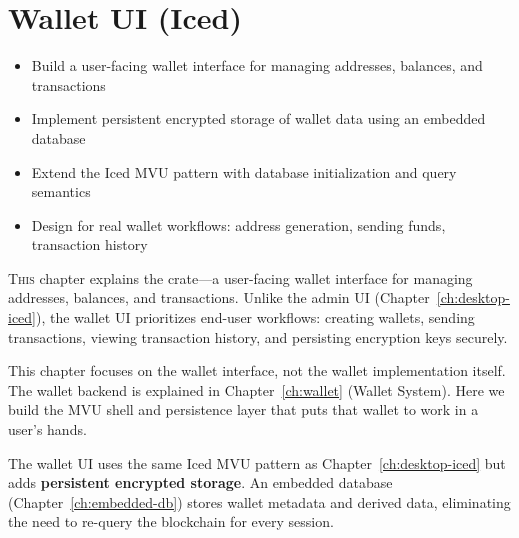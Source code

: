 \chapter{Wallet UI (Iced)}
\label{ch:wallet-iced}

\begin{learnbox}
\begin{itemize}
  \item Build a user-facing wallet interface for managing addresses, balances, and transactions
  \item Implement persistent encrypted storage of wallet data using an embedded database
  \item Extend the Iced MVU pattern with database initialization and query semantics
  \item Design for real wallet workflows: address generation, sending funds, transaction history
\end{itemize}
\end{learnbox}

\lettrine{T}{his} chapter explains the  crate---a user-facing wallet interface for managing addresses, balances, and transactions. Unlike the admin UI (Chapter~\ref{ch:desktop-iced}), the wallet UI prioritizes end-user workflows: creating wallets, sending transactions, viewing transaction history, and persisting encryption keys securely.

\begin{notebox}[Focus]
This chapter focuses on the wallet interface, not the wallet implementation itself. The wallet backend is explained in Chapter~\ref{ch:wallet} (Wallet System). Here we build the MVU shell and persistence layer that puts that wallet to work in a user's hands.
\end{notebox}

The wallet UI uses the same Iced MVU pattern as Chapter~\ref{ch:desktop-iced} but adds \textbf{persistent encrypted storage}. An embedded database (Chapter~\ref{ch:embedded-db}) stores wallet metadata and derived data, eliminating the need to re-query the blockchain for every session.

